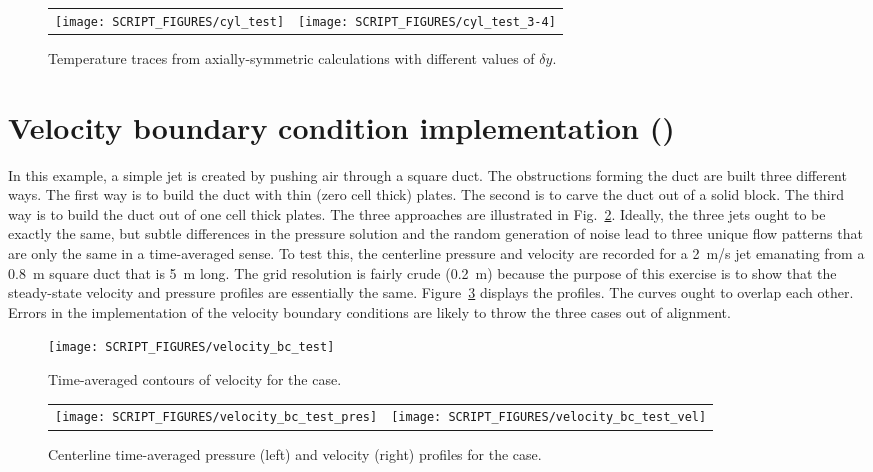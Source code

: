 \documentclass[11pt]{book}
\begin{document}
\begin{figure}[!ht]
\begin{tabular*}{\textwidth}{lr}
\texttt{[image: SCRIPT\_FIGURES/cyl\_test]} &
\texttt{[image: SCRIPT\_FIGURES/cyl\_test\_3-4]}
\end{tabular*}
\caption[The  test cases]{Temperature traces from axially-symmetric calculations with different values of $\delta y$.}
\label{cyl_test_fig}
\end{figure}


\newpage

\section{Velocity boundary condition implementation (\texorpdfstring{}{velocity\_bc\_test})}
\label{velocity_bc_test}

In this example, a simple jet is created by pushing air through a square duct. The obstructions forming the duct are built three different ways. The first way is to build the duct with thin (zero cell thick) plates. The second is to carve the duct out of a solid block. The third way is to build the duct out of one cell thick plates. The three approaches are illustrated in Fig.~\ref{velocity_bc_test_image}. Ideally, the three jets ought to be exactly the same, but subtle differences in the pressure solution and the random generation of noise lead to three unique flow patterns that are only the same in a time-averaged sense. To test this, the centerline pressure and velocity are recorded for a 2~m/s jet emanating from a 0.8~m square duct that is 5~m long. The grid resolution is fairly crude (0.2~m) because the purpose of this exercise is to show that the steady-state velocity and pressure profiles are essentially the same. Figure~\ref{velocity_bc_test_plot} displays the profiles. The curves ought to overlap each other. Errors in the implementation of the velocity boundary conditions are likely to throw the three cases out of alignment.

\begin{figure}[!ht]
\centering
\texttt{[image: SCRIPT\_FIGURES/velocity\_bc\_test]}
\caption[Images of the  test case]{Time-averaged contours of velocity for the  case.}
\label{velocity_bc_test_image}
\end{figure}

\begin{figure}[!ht]
\begin{tabular*}{\textwidth}{lr}
\texttt{[image: SCRIPT\_FIGURES/velocity\_bc\_test\_pres]} &
\texttt{[image: SCRIPT\_FIGURES/velocity\_bc\_test\_vel]}
\end{tabular*}
\caption[The  test case]{Centerline time-averaged pressure (left) and velocity (right) profiles for the  case.}
\label{velocity_bc_test_plot}
\end{figure}
\end{document}

